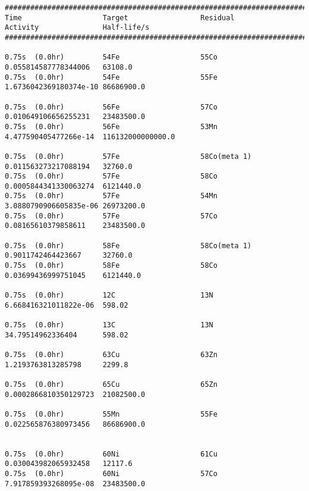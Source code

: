 \begin{lstlisting}[style=sOutputFile,caption={Final results for steel irradiation},label={listing:alexsteel}]
####################################################################################################################
Time                   Target                 Residual               Activity               Half-life/s            
####################################################################################################################

0.75s  (0.0hr)         54Fe                   55Co                   0.055814587778344006   63108.0               
0.75s  (0.0hr)         54Fe                   55Fe                   1.6736042369180374e-10 86686900.0            

0.75s  (0.0hr)         56Fe                   57Co                   0.010649106656255231   23483500.0            
0.75s  (0.0hr)         56Fe                   53Mn                   4.477590405477266e-14  116132000000000.0     

0.75s  (0.0hr)         57Fe                   58Co(meta 1)           0.011563273217088194   32760.0               
0.75s  (0.0hr)         57Fe                   58Co                   0.0005844341330063274  6121440.0             
0.75s  (0.0hr)         57Fe                   54Mn                   3.0880790906605835e-06 26973200.0            
0.75s  (0.0hr)         57Fe                   57Co                   0.08165610379858611    23483500.0            

0.75s  (0.0hr)         58Fe                   58Co(meta 1)           0.9011742464423667     32760.0               
0.75s  (0.0hr)         58Fe                   58Co                   0.03699436999751045    6121440.0             

0.75s  (0.0hr)         12C                    13N                    6.668416321011822e-06  598.02                

0.75s  (0.0hr)         13C                    13N                    34.79514962336404      598.02                

0.75s  (0.0hr)         63Cu                   63Zn                   1.2193763813285798     2299.8                

0.75s  (0.0hr)         65Cu                   65Zn                   0.0002866810350129723  21082500.0            

0.75s  (0.0hr)         55Mn                   55Fe                   0.022565876380973456   86686900.0            


0.75s  (0.0hr)         60Ni                   61Cu                   0.030043982065932458   12117.6               
0.75s  (0.0hr)         60Ni                   57Co                   7.917859393268095e-08  23483500.0            


\end{lstlisting}
